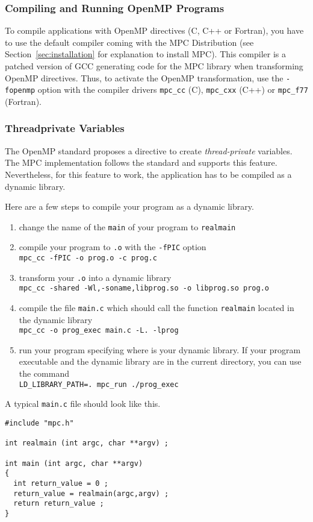 \documentclass[a4paper,11pt]{article}
\begin{document}
\subsubsection{Compiling and Running OpenMP Programs}
To compile applications with OpenMP directives (C, C++ or Fortran), you have to
use the default compiler coming with the MPC Distribution (see
    Section~\ref{sec:installation} for explanation to install MPC).
This compiler is a patched version of GCC generating code for the MPC library
when transforming OpenMP directives.
Thus, to activate the OpenMP transformation, use the \texttt{-fopenmp} option
with the compiler drivers \texttt{mpc\_cc} (C), \texttt{mpc\_cxx} (C++) or \texttt{mpc\_f77} (Fortran).

\subsubsection{Threadprivate Variables}

The OpenMP standard proposes a directive to create \emph{thread-private} variables.
The MPC implementation follows the standard and supports this feature.
Nevertheless, for this feature to work, the application has to be compiled as a dynamic library.

Here are a few steps to compile your program as a dynamic library.
\begin{enumerate}
\item change the name of the \texttt{main} of your program to \texttt{realmain}
\item compile your program to \texttt{.o} with the \texttt{-fPIC} option\\
\verb!mpc_cc -fPIC -o prog.o -c prog.c!
\item transform your \texttt{.o} into a dynamic library\\
\verb!mpc_cc -shared -Wl,-soname,libprog.so -o libprog.so prog.o!
\item compile the file \texttt{main.c} which should call the function \texttt{realmain} located
in the dynamic library\\
\verb!mpc_cc -o prog_exec main.c -L. -lprog!
\item run your program specifying where is your dynamic library. If your program
executable and the dynamic library are in the current directory, you can use the command\\
\verb!LD_LIBRARY_PATH=. mpc_run ./prog_exec!
\end{enumerate}

A typical \texttt{main.c} file should look like this.
\begin{verbatim}
#include "mpc.h"

int realmain (int argc, char **argv) ;

int main (int argc, char **argv)
{
  int return_value = 0 ;
  return_value = realmain(argc,argv) ;
  return return_value ;
}
\end{verbatim}
\end{document}
